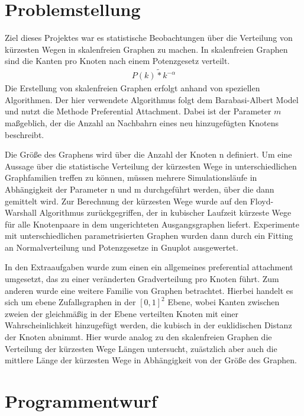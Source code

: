 \documentclass[10pt]{article}
\begin{document}
\lstset{
	language=C,
	basicstyle=\footnotesize,
	frame=tb,
	xleftmargin=.2\textwidth,
	xrightmargin=.2\textwidth
}
\onehalfspacing

\tableofcontents
\newpage
\section{Problemstellung}
 
Ziel dieses Projektes war es statistische Beobachtungen über die Verteilung von kürzesten Wegen in skalenfreien Graphen zu machen. In skalenfreien Graphen sind die Kanten pro Knoten nach einem Potenzgesetz verteilt. 
\begin{align*}
P(k) \tilde{*} k^{-\alpha}
\end{align*}
Die Erstellung von skalenfreien Graphen erfolgt anhand von speziellen Algorithmen. Der hier verwendete Algorithmus folgt dem Barabasi-Albert Model und nutzt die Methode Preferential Attachment. Dabei ist der Parameter $m$ maßgeblich, der die Anzahl an Nachbahrn eines neu hinzugefügten Knotens beschreibt. 

Die Größe des Graphens wird über die Anzahl der Knoten n definiert. Um eine Aussage über die statistische Verteilung der kürzesten Wege in unterschiedlichen Graphfamilien treffen zu können, müssen mehrere Simulationsläufe in Abhängigkeit der Parameter n und m durchgeführt werden, über die dann gemittelt wird.
Zur Berechnung der kürzesten Wege wurde auf den Floyd-Warshall Algorithmus zurückgegriffen, der in kubischer Laufzeit kürzeste Wege für alle Knotenpaare in dem ungerichteten Ausgangsgraphen liefert.
Experimente mit unterschiedlichen parametrisierten Graphen wurden dann durch ein Fitting an Normalverteilung und Potenzgesetze in Gnuplot ausgewertet.

In den Extraaufgaben wurde zum einen ein allgemeines preferential attachment umgesetzt, das zu einer veränderten Gradverteilung pro Knoten führt. Zum anderen wurde eine weitere Familie von Graphen betrachtet. Hierbei handelt es sich um ebene Zufallsgraphen in der $[0,1]^2$ Ebene, wobei Kanten zwischen zweien der gleichmäßig in der Ebene verteilten Knoten mit einer Wahrscheinlichkeit hinzugefügt werden, die kubisch in der euklidischen Distanz der Knoten abnimmt. Hier wurde analog zu den skalenfreien Graphen die Verteilung der kürzesten Wege Längen untersucht, zuästzlich aber auch die mittlere Länge der kürzesten Wege in Abhängigkeit von der Größe des Graphen.

\section{Programmentwurf}
\end{document}
